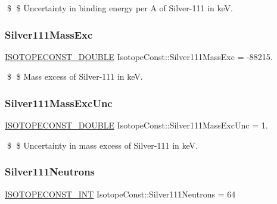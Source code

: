 \$ \$ Uncertainty in binding energy per A of Silver-\/111 in keV. \mbox{\label{group___isotope_const-_silver-_ag111_gad14cb0e83af11b8caf9381607f592eaf}} 
\subsubsection{\texorpdfstring{Silver111\+Mass\+Exc}{Silver111MassExc}}
{\footnotesize\ttfamily \mbox{\hyperlink{group___isotope_const-_macros_ga8f45a7272ce02c0b4c65c44636ed719a}{I\+S\+O\+T\+O\+P\+E\+C\+O\+N\+S\+T\+\_\+\+D\+O\+U\+B\+LE}} Isotope\+Const\+::\+Silver111\+Mass\+Exc = -\/88215.}

\$ \$ Mass excess of Silver-\/111 in keV. \mbox{\label{group___isotope_const-_silver-_ag111_ga6275f9bd3c519444be84fba68d48c185}} 
\subsubsection{\texorpdfstring{Silver111\+Mass\+Exc\+Unc}{Silver111MassExcUnc}}
{\footnotesize\ttfamily \mbox{\hyperlink{group___isotope_const-_macros_ga8f45a7272ce02c0b4c65c44636ed719a}{I\+S\+O\+T\+O\+P\+E\+C\+O\+N\+S\+T\+\_\+\+D\+O\+U\+B\+LE}} Isotope\+Const\+::\+Silver111\+Mass\+Exc\+Unc = 1.}

\$ \$ Uncertainty in mass excess of Silver-\/111 in keV. \mbox{\label{group___isotope_const-_silver-_ag111_ga3e1555ded273ad9ccfd82b26226aeb9e}} 
\subsubsection{\texorpdfstring{Silver111\+Neutrons}{Silver111Neutrons}}
{\footnotesize\ttfamily \mbox{\hyperlink{group___isotope_const-_macros_ga5f18360b3e99483a35c32d789e62621c}{I\+S\+O\+T\+O\+P\+E\+C\+O\+N\+S\+T\+\_\+\+I\+NT}} Isotope\+Const\+::\+Silver111\+Neutrons = 64}

